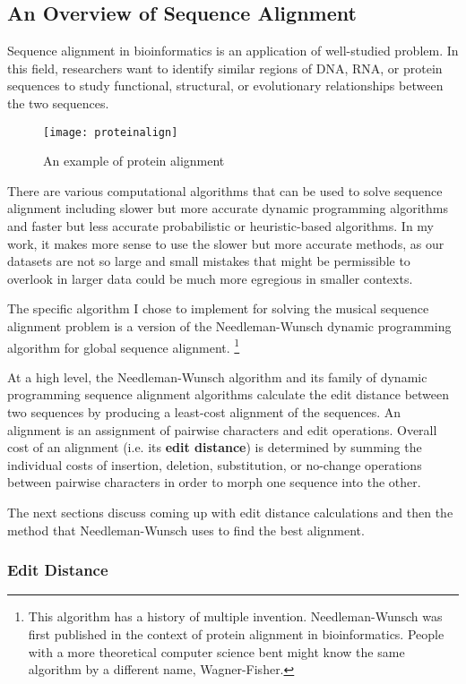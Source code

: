 \subsection{An Overview of Sequence Alignment}
Sequence alignment in bioinformatics is an application of well-studied problem. In this field, researchers want to identify similar regions of DNA, RNA, or protein sequences to study functional, structural, or evolutionary relationships between the two sequences.

\begin{figure}[!ht]

\centering
\texttt{[image: proteinalign]}
\caption{An example of protein alignment \cite{proteins}}
\end{figure}

There are various computational algorithms that can be used to solve sequence alignment including slower but more accurate dynamic programming algorithms and faster but less accurate probabilistic or heuristic-based algorithms. In my work, it makes more sense to use the slower but more accurate methods, as our datasets are not so large and small mistakes that might be permissible to overlook in larger data could be much more egregious in smaller contexts.

The specific algorithm I chose to implement for solving the musical sequence alignment problem is a version of the Needleman-Wunsch dynamic programming algorithm for global sequence alignment. \footnote{This algorithm has a history of multiple invention. Needleman-Wunsch was first published in the context of protein alignment in bioinformatics. People with a more theoretical computer science bent might know the same algorithm by a different name, Wagner-Fisher.} 

At a high level, the Needleman-Wunsch algorithm and its family of dynamic programming sequence alignment algorithms calculate the edit distance between two sequences by producing a least-cost alignment of the sequences. An alignment is an assignment of pairwise characters and edit operations. Overall cost of an alignment (i.e. its \textbf{edit distance}) is determined by summing the individual costs of insertion, deletion, substitution, or no-change operations between pairwise characters in order to morph one sequence into the other. 

The next sections discuss coming up with edit distance calculations and then the method that Needleman-Wunsch uses to find the best alignment. 

\subsubsection{Edit Distance}

